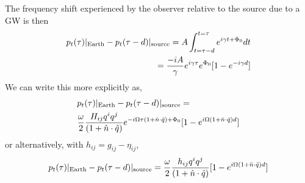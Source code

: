 \documentclass[fleqn,usenatbib,useAMS]{mnras}
\begin{document}
The frequency shift experienced by the observer relative to the source due to a GW is then
\begin{align}
	p_t(\tau)|_{\rm Earth} - p_t(\tau - d)|_{\rm source} = A \int_{t = \tau - d}^{t=\tau} e^{i \gamma t + \Phi_0}dt  \\
	=\frac{-iA}{\gamma} e^{i \gamma \tau}e^{\Phi_0}[1 - e^{-i \gamma d}] 
	\label{eq:concise}
\end{align}
We can write this more explicitly as,
\begin{align} \label{eq:final}
	&p_t(\tau)|_{\rm Earth} - p_t(\tau - d)|_{\rm source} = \\
	&\frac{ \omega}{2} \frac{H_{ij}q^i q^j  }{(1 + \hat{n} \cdot \hat{q})}e^{-i \Omega \tau(1+\bar{n} \cdot \bar{q}) + \Phi_0} [1 - e^{i \Omega(1+\bar{n} \cdot \bar{q}) d}]
\end{align}
or alternatively, with $h_{ij} = g_{ij} - \eta_{ij}$,
\begin{equation}
	p_t(\tau)|_{\rm Earth} - p_t(\tau - d)|_{\rm source} =\frac{ \omega}{2} \frac{h_{ij} q^i q^j  }{(1 + \hat{n} \cdot \hat{q})} [1 - e^{i \Omega(1+\bar{n} \cdot \bar{q}) d}]
	\label{eq:freq_shift}
\end{equation}
\end{document}
